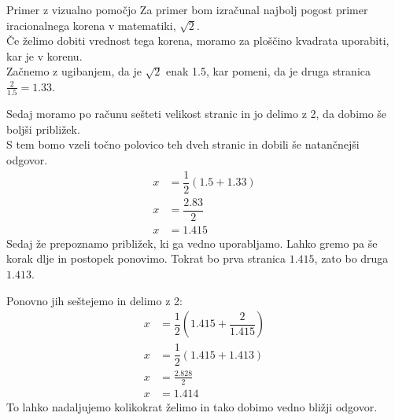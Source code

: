 \documentclass{article}
\begin{document}
\begin{zgledbox}{Primer z vizualno pomočjo}
Za primer bom izračunal najbolj pogost primer iracionalnega korena v matematiki, $\sqrt{2}$.\\
Če želimo dobiti vrednost tega korena, moramo za ploščino kvadrata uporabiti, kar je v korenu.\\
Začnemo z ugibanjem, da je $\sqrt{2}$ enak 1.5, kar pomeni, da je druga stranica $\frac{2}{1.5} = 1.33$.
\begin{center}
\end{center}
Sedaj moramo po računu sešteti velikost stranic in jo delimo z 2, da dobimo še boljši približek.\\
S tem bomo vzeli točno polovico teh dveh stranic in dobili še natančnejši odgovor.\\
\begin{align*}
x &= \dfrac{1}{2}\left(1.5 + 1.33\right)\\
x &= \dfrac{2.83}{2}\\
x &= 1.415
\end{align*}
Sedaj že prepoznamo približek, ki ga vedno uporabljamo. Lahko gremo pa še korak dlje in postopek ponovimo.
Tokrat bo prva stranica $1.415$, zato bo druga $1.413$.
\begin{center}
\end{center}
Ponovno jih seštejemo in delimo z 2:\\
\begin{align*}
x &= \dfrac{1}{2} \left(1.415 + \dfrac{2}{1.415}\right)\\
x &= \dfrac{1}{2} \left(1.415 + 1.413\right)\\
x &= \frac{2.828}{2}\\
x &= 1.414
\end{align*}
To lahko nadaljujemo kolikokrat želimo in tako dobimo vedno bližji odgovor.
\end{zgledbox}
\end{document}
